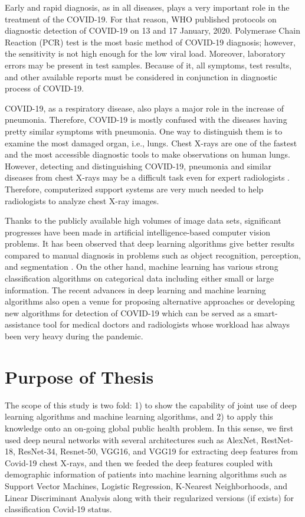 Early and rapid diagnosis, as in all diseases, plays a very important role in the treatment of the COVID-19. For that reason, WHO published protocols on diagnostic detection of COVID-19 on 13 and 17 January, 2020. Polymerase Chain Reaction (PCR) test \cite{pcr_cleveland_clinic} is the most basic method of COVID-19 diagnosis; however, the sensitivity is not high enough for the low viral load. Moreover, laboratory errors may be present in test samples. Because of it, all symptoms, test results, and other available reports must be considered in conjunction in diagnostic process of COVID-19.

COVID-19, as a respiratory disease, also plays a major role in the increase of pneumonia. Therefore, COVID-19 is mostly confused with the diseases having pretty similar symptoms with pneumonia. One way to distinguish them is to examine the most damaged organ, i.e., lungs. Chest X-rays are one of the fastest and the most accessible diagnostic tools to make observations on human lungs. However, detecting and distinguishing COVID-19, pneumonia and similar diseases from chest X-rays may be a difficult task even for expert radiologists \cite{covid_vs_pneumonia}. Therefore, computerized support systems are very much needed to help radiologists to analyze chest X-ray images. 

Thanks to the publicly available high volumes of image data sets, significant progresses have been made in artificial intelligence-based computer vision problems. It has been observed that deep learning algorithms give better results compared to manual diagnosis in problems such as object recognition, perception, and segmentation \cite{success_of_dl}. On the other hand, machine learning has various strong classification algorithms on categorical data including either small or large information. The recent advances in deep learning and machine learning algorithms also open a venue for proposing alternative approaches or developing new algorithms for detection of COVID-19 which can be served as a smart-assistance tool for medical doctors and radiologists whose workload has always been very heavy during the pandemic.

\newpage

\section{Purpose of Thesis}\label{purposeofthesis}

The scope of this study is two fold: 1) to show the capability of joint use of deep learning algorithms and machine learning algorithms, and 2) to apply this knowledge onto an on-going global public health problem. In this sense, we first used deep neural networks with several architectures such as AlexNet, RestNet-18, ResNet-34, Resnet-50, VGG16, and VGG19 for extracting deep features from Covid-19 chest X-rays, and then  
we feeded the deep features coupled with demographic information of patients into machine learning algorithms  such as Support Vector Machines, Logistic Regression, K-Nearest Neighborhoods, and Linear Discriminant Analysis along with their regularized versions (if exists) for  classification Covid-19 status.

